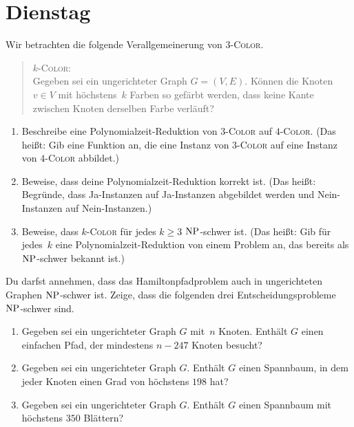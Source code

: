\documentclass{uebung_cs}
\begin{document}
\section*{Dienstag}

\begin{exercise}[Färbbarkeit][\href{https://moodle.studiumdigitale.uni-frankfurt.de/moodle/mod/assign/view.php?id=241464}{Moodle}\athome]
    Wir betrachten die folgende Verallgemeinerung von $3$-\textsc{Color}.
    \begin{quote}
        $k$-\textsc{Color}:\\
        Gegeben sei ein ungerichteter Graph $G = (V,E)$. Können die Knoten $v \in V$ mit höchstens~$k$ Farben so gefärbt werden, dass keine Kante zwischen Knoten derselben Farbe verläuft?
    \end{quote}
    \begin{enumerate}
        \item\mittel Beschreibe eine Polynomialzeit-Reduktion von $3$-\textsc{Color} auf $4$-\textsc{Color}. (Das heißt: Gib eine Funktion an, die eine Instanz von $3$-\textsc{Color} auf eine Instanz von $4$-\textsc{Color} abbildet.)
        \item\mittel Beweise, dass deine Polynomialzeit-Reduktion korrekt ist. (Das heißt: Begründe, dass Ja-Instanzen auf Ja-Instanzen abgebildet werden und Nein-Instanzen auf Nein-Instanzen.)
        \item\mittel Beweise, dass $k$-\textsc{Color} für jedes $k \geq 3$ $\mathrm{NP}$-schwer ist. (Das heißt: Gib für jedes~$k$ eine Polynomialzeit-Reduktion von einem Problem an, das bereits als $\mathrm{NP}$-schwer bekannt ist.)
    \end{enumerate}
\end{exercise}

\begin{exercise}[Pfade und Spannbäume][\atschool]
    Du darfst annehmen, dass das Hamiltonpfadproblem auch in ungerichteten Graphen $\mathrm{NP}$-schwer ist.
    Zeige, dass die folgenden drei Entscheidungsprobleme $\mathrm{NP}$-schwer sind.
    \begin{enumerate}
        \item\mittel Gegeben sei ein ungerichteter Graph $G$ mit~$n$ Knoten. Enthält $G$ einen einfachen Pfad, der mindestens $n-247$ Knoten besucht?
        \item\mittel Gegeben sei ein ungerichteter Graph $G$. Enthält $G$ einen Spannbaum, in dem jeder Knoten einen Grad von höchstens $198$ hat?
        \item\mittel Gegeben sei ein ungerichteter Graph $G$. Enthält $G$ einen Spannbaum mit höchstens $350$ Blättern?
    \end{enumerate}
\end{exercise}
\end{document}
